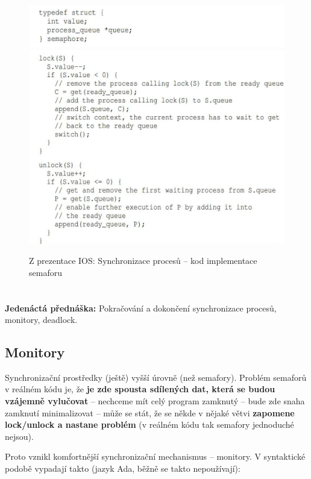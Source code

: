 \documentclass[a4paper, 11pt]{article}
\begin{document}
\begin{figure} [ht]
    \centering
    \includegraphics[width=\textwidth]{10.6_1.jpg}
    \includegraphics[width=\textwidth]{10.6_2.jpg}
    \caption{Z prezentace IOS: Synchronizace procesů -- kod implementace semaforu}
\end{figure}

\clearpage
\section{}
\textbf{Jedenáctá přednáška:} Pokračování a dokončení synchronizace procesů, monitory, deadlock.
 
\subsection{Monitory}
Synchronizační prostředky (ještě) vyšší úrovně (než semafory). Problém semaforů v reálném kódu je, že \textbf{je zde spousta sdílených dat, která se budou vzájemně vylučovat} -- nechceme mít celý program zamknutý -- bude zde snaha zamknutí minimalizovat -- může se stát, že se někde v nějaké větvi \textbf{zapomene lock/unlock a nastane problém} (v reálném kódu tak semafory jednoduché nejsou).
 
Proto vznikl komfortnější synchronizační mechanismus -- monitory. V syntaktické podobě vypadají takto (jazyk Ada, běžně se takto nepoužívají):
 
\end{document}
